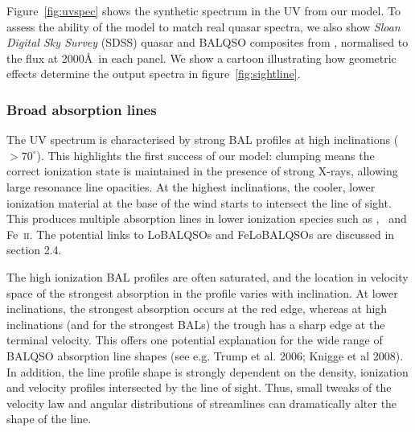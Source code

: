 \documentclass[preprint, a4paper, 11pt]{aastex}
\begin{document}



Figure~\ref{fig:uvspec} shows the synthetic spectrum in the UV from our model. 
To assess the ability of the model to match real 
quasar spectra, we also show {\sl Sloan Digital Sky Survey} (SDSS) quasar and BALQSO 
composites from \cite{reichard2003}, normalised to the flux at 2000\AA\ in each panel. 
We show a cartoon illustrating how geometric effects determine
the output spectra in figure~\ref{fig:sightline}.  

\subsubsection{Broad absorption lines}

The UV spectrum is characterised by strong BAL 
profiles at high inclinations ($> 70^\circ$). 
This highlights the first success of our model: 
clumping means the correct ionization state 
is maintained in the presence of strong X-rays, 
allowing large resonance line opacities. 
At the highest inclinations, the 
cooler, lower ionization material at the base of the wind
starts to intersect the line of sight. This produces 
multiple absorption lines in lower ionization species such as \mg,
\al\ and Fe~\textsc{ii}. The potential links to LoBALQSOs and 
FeLoBALQSOs are discussed in section 2.4.

The high ionization BAL profiles are often saturated, and the location in velocity space
of the strongest absorption in the profile varies with inclination.
At lower inclinations, the strongest absorption occurs at the red edge,
whereas at high inclinations (and for the strongest BALs)
the trough has a sharp edge at the terminal velocity.
This offers one potential explanation for the wide range of BALQSO absorption
line shapes (see e.g. Trump et al. 2006; Knigge et al 2008).
In addition, the line profile shape is strongly dependent 
on the density, ionization and velocity 
profiles intersected by the line of sight. Thus, small tweaks of the velocity
law and angular distributions of streamlines can dramatically alter
the shape of the line.
\end{document}
